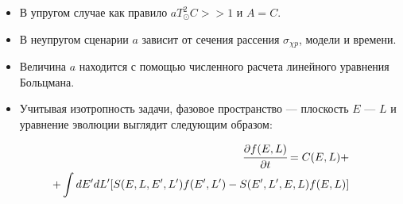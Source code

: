 \begin{itemize}
	\item В упругом случае как правило $aT_{\odot}^2C >> 1$ и $A = C$. 
	\item В неупругом сценарии $a$ зависит от сечения рассения $\sigma_{\chi p}$, модели и времени.
	\item Величина $a$ находится с помощью численного расчета линейного уравнения Больцмана.
	\item Учитывая изотропность задачи, фазовое пространство --- плоскость $E$ --- $L$ и уравнение эволюции выглядит следующим образом:
\end{itemize}

\begin{eqnarray*}
	\cfrac{\partial f(E,L)}{\partial t} = C(E,L) + \\
	 + \int{dE'dL' [S(E,L,E',L') f(E',L') - S(E',L',E,L)f(E,L)]}
\end{eqnarray*}
